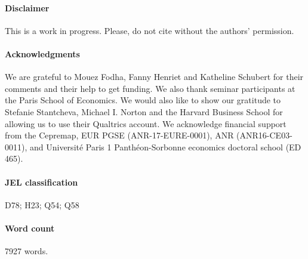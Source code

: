 \documentclass[english,5p,authoryear]{elsarticle}
\begin{document}




\paragraph*{\textbf{Disclaimer}} This is a work in progress. Please, do not cite without the authors' permission. %

\paragraph*{Acknowledgments} We are grateful to Mouez Fodha, Fanny Henriet and Katheline Schubert for their comments and their help to get funding. We also thank seminar participants at the Paris School of Economics. We would also like to show our gratitude to Stefanie Stantcheva, Michael I. Norton and the Harvard Business School for allowing us to use their Qualtrics account. We acknowledge financial support from the Cepremap, EUR PGSE (ANR-17-EURE-0001), ANR (ANR16-CE03-0011), and Université Paris 1 Panthéon-Sorbonne economics doctoral school (ED 465).

\paragraph*{JEL classification} D78; H23; Q54; Q58

\paragraph{Word count} 7927 words.


\end{document}
